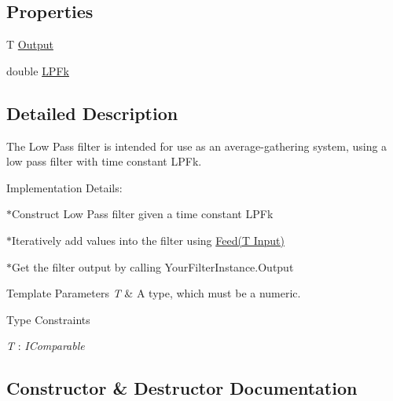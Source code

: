 \subsection*{Properties}
\begin{DoxyCompactItemize}
\item 
T \hyperlink{class_robotics_library_1_1_filters_1_1_low_pass_a83f66e4bfd6737c56614f3bb9a73876f}{Output}
\item 
double \hyperlink{class_robotics_library_1_1_filters_1_1_low_pass_aa10538fde21bb3d7a4c5640b615c4013}{L\+P\+Fk}
\end{DoxyCompactItemize}


\subsection{Detailed Description}
The Low Pass filter is intended for use as an average-\/gathering system, using a low pass filter with time constant {\ttfamily L\+P\+Fk}.

Implementation Details\+:

$\ast$\+Construct Low Pass filter given a time constant {\ttfamily L\+P\+Fk}

$\ast$\+Iteratively add values into the filter using {\ttfamily \hyperlink{class_robotics_library_1_1_filters_1_1_low_pass_adba4c542b4935845404729ebb2222b72}{Feed(\+T Input)}}

$\ast$\+Get the filter output by calling {\ttfamily Your\+Filter\+Instance.\+Output}


\begin{DoxyTemplParams}{Template Parameters}
{\em T} & A type, which must be a numeric.\\
\hline
\end{DoxyTemplParams}
\begin{Desc}
\item[Type Constraints]\begin{description}
\item[{\em T} : {\em I\+Comparable}]\end{description}
\end{Desc}


\subsection{Constructor \& Destructor Documentation}
\mbox{\label{class_robotics_library_1_1_filters_1_1_low_pass_ada79534600a7f4a4dab17c40976a2f74}} 
